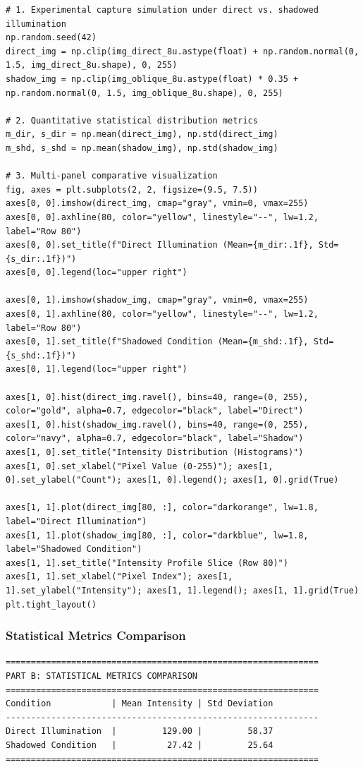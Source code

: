 \documentclass[12pt]{article}
\begin{document}
\begin{lstlisting}[style=code]
# 1. Experimental capture simulation under direct vs. shadowed illumination
np.random.seed(42)
direct_img = np.clip(img_direct_8u.astype(float) + np.random.normal(0, 1.5, img_direct_8u.shape), 0, 255)
shadow_img = np.clip(img_oblique_8u.astype(float) * 0.35 + np.random.normal(0, 1.5, img_oblique_8u.shape), 0, 255)

# 2. Quantitative statistical distribution metrics
m_dir, s_dir = np.mean(direct_img), np.std(direct_img)
m_shd, s_shd = np.mean(shadow_img), np.std(shadow_img)

# 3. Multi-panel comparative visualization
fig, axes = plt.subplots(2, 2, figsize=(9.5, 7.5))
axes[0, 0].imshow(direct_img, cmap="gray", vmin=0, vmax=255)
axes[0, 0].axhline(80, color="yellow", linestyle="--", lw=1.2, label="Row 80")
axes[0, 0].set_title(f"Direct Illumination (Mean={m_dir:.1f}, Std={s_dir:.1f})")
axes[0, 0].legend(loc="upper right")

axes[0, 1].imshow(shadow_img, cmap="gray", vmin=0, vmax=255)
axes[0, 1].axhline(80, color="yellow", linestyle="--", lw=1.2, label="Row 80")
axes[0, 1].set_title(f"Shadowed Condition (Mean={m_shd:.1f}, Std={s_shd:.1f})")
axes[0, 1].legend(loc="upper right")

axes[1, 0].hist(direct_img.ravel(), bins=40, range=(0, 255), color="gold", alpha=0.7, edgecolor="black", label="Direct")
axes[1, 0].hist(shadow_img.ravel(), bins=40, range=(0, 255), color="navy", alpha=0.7, edgecolor="black", label="Shadow")
axes[1, 0].set_title("Intensity Distribution (Histograms)")
axes[1, 0].set_xlabel("Pixel Value (0-255)"); axes[1, 0].set_ylabel("Count"); axes[1, 0].legend(); axes[1, 0].grid(True)

axes[1, 1].plot(direct_img[80, :], color="darkorange", lw=1.8, label="Direct Illumination")
axes[1, 1].plot(shadow_img[80, :], color="darkblue", lw=1.8, label="Shadowed Condition")
axes[1, 1].set_title("Intensity Profile Slice (Row 80)")
axes[1, 1].set_xlabel("Pixel Index"); axes[1, 1].set_ylabel("Intensity"); axes[1, 1].legend(); axes[1, 1].grid(True)
plt.tight_layout()
\end{lstlisting}

\subsubsection*{Statistical Metrics Comparison}
\begin{lstlisting}[style=output]
==============================================================
PART B: STATISTICAL METRICS COMPARISON
==============================================================
Condition            | Mean Intensity | Std Deviation
--------------------------------------------------------------
Direct Illumination  |         129.00 |         58.37
Shadowed Condition   |          27.42 |         25.64
==============================================================
\end{lstlisting}
\end{document}

